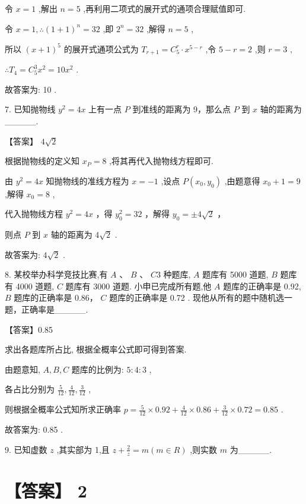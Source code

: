\documentclass[10pt]{article}
\begin{document}
令 \(x = 1\) ,解出 \(n = 5\) ,再利用二项式的展开式的通项合理赋值即可.

令 \(x = 1,\therefore {\left( 1 + 1\right) }^{n} = {32}\) ,即 \({2}^{n} = {32}\) ,解得 \(n = 5\) ,

所以 \({\left( x + 1\right) }^{5}\) 的展开式通项公式为 \({T}_{r + 1} = {C}_{5}^{r} \cdot  {x}^{5 - r}\) ,令 \(5 - r = 2\) ,则 \(r = 3\) ,

\(\therefore {T}_{4} = {C}_{5}^{3}{x}^{2} = {10}{x}^{2}\) .

故答案为: 10 .

7. 已知抛物线 \({y}^{2} = {4x}\) 上有一点 \(P\) 到准线的距离为 9，那么点 \(P\) 到 \(x\) 轴的距离为\_\_\_\_\_.

【答案】 \(4\sqrt{2}\)

根据抛物线的定义知 \({x}_{P} = 8\) ,将其再代入抛物线方程即可.

由 \({y}^{2} = {4x}\) 知抛物线的准线方程为 \(x =  - 1\) ,设点 \(P\left( {{x}_{0},{y}_{0}}\right)\) ,由题意得 \({x}_{0} + 1 = 9\) ,解得 \({x}_{0} = 8\) ,

代入抛物线方程 \({y}^{2} = {4x}\) ，得 \({y}_{0}^{2} = {32}\) ，解得 \({y}_{0} =  \pm  4\sqrt{2}\) ，

则点 \(P\) 到 \(x\) 轴的距离为 \(4\sqrt{2}\) .

故答案为: \(4\sqrt{2}\) .

8. 某校举办科学竞技比赛,有 \(A\text{ 、 }B\text{ 、 }{C3}\) 种题库, \(A\) 题库有 5000 道题, \(B\) 题库有 4000 道题, \(C\) 题库有 3000 道题. 小申已完成所有题,他 \(A\) 题库的正确率是 0.92, \(B\) 题库的正确率是 0.86， \(C\) 题库的正确率是 0.72 . 现他从所有的题中随机选一题，正确率是\_\_\_\_\_.

【答案】0.85

求出各题库所占比, 根据全概率公式即可得到答案.

由题意知, \(A,B,C\) 题库的比例为: \(5 : 4 : 3\) ,

各占比分别为 \(\frac{5}{12},\frac{4}{12},\frac{3}{12}\) ,

则根据全概率公式知所求正确率 \(p = \frac{5}{12} \times  {0.92} + \frac{4}{12} \times  {0.86} + \frac{3}{12} \times  {0.72} = {0.85}\) .

故答案为: 0.85 .

9. 已知虚数 \(z\) ,其实部为 1,且 \(z + \frac{2}{z} = m\left( {m \in  R}\right)\) ,则实数 \(m\) 为\_\_\_\_\_.

\section*{【答案】 2}
\end{document}
